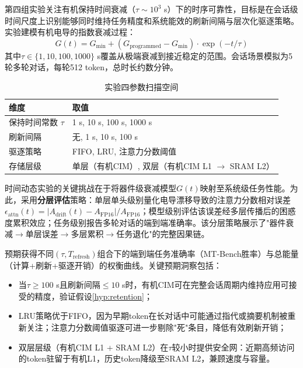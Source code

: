 第四组实验关注有机保持时间衰减（$\tau \sim 10^3$ s）下的时序可靠性，目标是在会话级时间尺度上识别能够同时维持任务精度和系统能效的刷新间隔与层次化驱逐策略。实验建模有机电导的指数衰减过程：
\begin{equation}
G(t) = G_{\min} + (G_{\text{programmed}} - G_{\min}) \cdot \exp(-t / \tau)
\label{eq:retention_decay}
\end{equation}
其中$\tau \in \{1, 10, 100, 1000\}$ s覆盖从极端衰减到接近稳定的范围。会话场景模拟为5轮多轮对话，每轮512 token，总时长约数分钟。

\begin{table}[htbp]
\centering
\caption{实验四参数扫描空间}
\label{tab:exp4_grid}
\begin{tabular}{ll}
\toprule
维度 & 取值 \\
\midrule
保持时间常数 $\tau$ & 1 s, 10 s, 100 s, 1000 s \\
刷新间隔 & 无, 1 s, 10 s, 100 s \\
驱逐策略 & FIFO, LRU, 注意力分数阈值 \\
存储层级 & 单层（有机CIM）, 双层（有机CIM L1 $\rightarrow$ SRAM L2） \\
\bottomrule
\end{tabular}
\end{table}

时间动态实验的关键挑战在于将器件级衰减模型$G(t)$映射至系统级任务性能。为此，采用\textbf{分层评估}策略：单层单头级别量化电导漂移导致的注意力分数相对误差$\epsilon_{\text{attn}}(t) = |A_{\text{drift}}(t) - A_{\text{FP16}}| / A_{\text{FP16}}$；模型级别评估该误差经多层传播后的困惑度累积效应；任务级别报告多轮对话的端到端准确率。该分层策略展示了"器件衰减$\rightarrow$单层误差$\rightarrow$多层累积$\rightarrow$任务退化"的完整因果链。

预期获得不同$(\tau, T_{\text{refresh}})$组合下的端到端任务准确率（MT-Bench胜率）与总能量（计算+刷新+驱逐开销）的权衡曲线。关键预期洞察包括：

\begin{itemize}
    \item 当$\tau \geq 100$ s且刷新间隔$\leq 10$ s时，有机CIM可在完整会话周期内维持应用可接受的精度，验证假设\ref{hyp:retention}；
    \item LRU策略优于FIFO，因为早期token在长对话中可能通过指代或摘要机制被重新关注；注意力分数阈值驱逐可进一步剔除"死"条目，降低有效刷新开销；
    \item 双层层级（有机CIM L1 + SRAM L2）在$\tau$较小时提供安全网：近期高频访问的token驻留于有机L1，历史token降级至SRAM L2，兼顾速度与容量。
\end{itemize}

